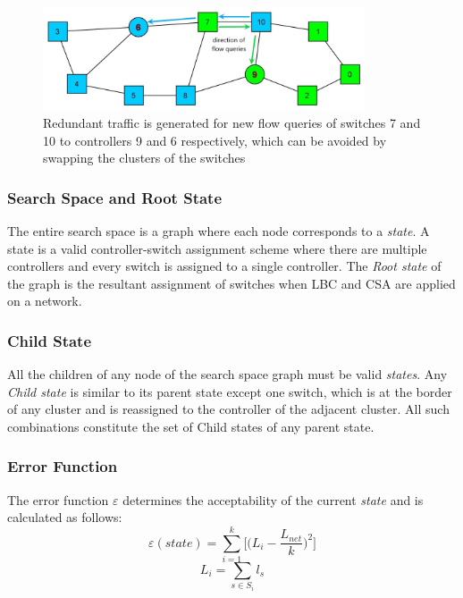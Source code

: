 \documentclass[preprint,12pt]{elsarticle}
\begin{document}
	
	\begin{figure}
		\centering
		\includegraphics[width=0.85\textwidth]{Images/Abilene_overlap.jpg}
		\caption{Redundant traffic is generated for new flow queries of switches 7 and 10 to controllers 9 and 6 respectively, which can be avoided by swapping the clusters of the switches} \label{fig:overlap}
	\end{figure}
	
	\subsubsection{Search Space and Root State}
	The entire search space is a graph where each node corresponds to a \textit{state}. A state is a valid controller-switch assignment scheme where there are multiple controllers and every switch is assigned to a single controller. The \textit{Root state} of the graph is the resultant assignment of switches when LBC and CSA are applied on a network.
	
	\subsubsection{Child State}
	All the children of any node of the search space graph must be valid \textit{states}. Any \textit{Child state} is similar to its parent state except one switch, which is at the border of any cluster and is reassigned to the controller of the adjacent cluster. All such combinations constitute the set of Child states of any parent state.
	
	\subsubsection{Error Function}
	The error function $\varepsilon$ determines the acceptability of the current \textit{state} and is calculated as follows:
	\begin{equation}
	\varepsilon(state) = \sum_{i=1}^{k}\Bigg[\Big(L_i - \frac{L_{net}}{k}\Big)^2\Bigg]
	\end{equation}
	\begin{equation} \label{eqn:cload}
	L_i = \sum_{s\in S_i}l_{s}
	\end{equation}
	
\end{document}
